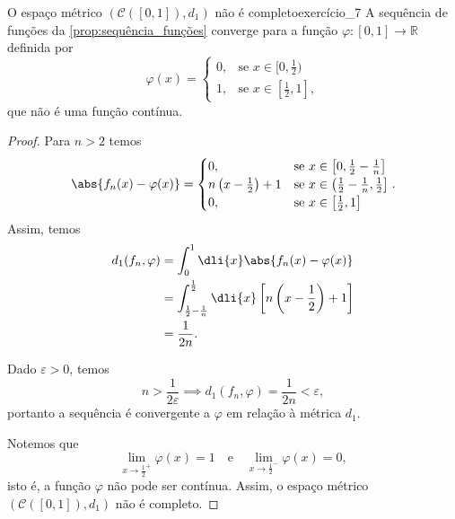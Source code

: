 \begin{proposition}{O espaço métrico \((\mathcal{C}([0,1]), d_1)\) não é completo}{exercício_7}
    A sequência de funções da \cref{prop:sequência_funções} converge para a função \(\varphi : [0,1] \to \mathbb{R}\) definida por
    \begin{equation*}
        \varphi(x) = \begin{cases}
            0, &\text{se }x \in [0,\frac12)\\
            1, &\text{se }x \in [\frac12,1],
        \end{cases}
    \end{equation*}
    que não é uma função contínua.
\end{proposition}
\begin{proof}
    Para \(n > 2\) temos
    \begin{equation*}
        \abs{f_n(x) - \varphi(x)} = \begin{cases}
            0, &\text{se }x \in \left[0, \frac12-\frac1n\right]\\
            n\left(x - \frac12\right) + 1&\text{se }x \in \left(\frac12 - \frac1n, \frac12\right]\\
            0, &\text{se }x \in \left[\frac12, 1\right]\\
        \end{cases}.
    \end{equation*}
    Assim, temos
    \begin{align*}
        d_1(f_n, \varphi) &= \int_0^1\dli{x} \abs{f_n(x) - \varphi(x)} \\
                          &= \int_{\frac12-\frac1n}^{\frac12}\dli{x} \left[n\left(x - \frac12\right) + 1\right]\\
                          &= \frac1{2n}.
    \end{align*}

    Dado \(\varepsilon > 0\), temos
    \begin{equation*}
        n > \frac{1}{2\varepsilon} \implies d_1(f_n, \varphi) = \frac{1}{2n} < \varepsilon,
    \end{equation*}
    portanto a sequência é convergente a \(\varphi\) em relação à métrica \(d_1\).

    Notemos que
    \begin{equation*}
        \lim_{x \to \frac12^+} \varphi(x) = 1\quad\text{e}\quad\lim_{x\to\frac12^-}\varphi(x) = 0,
    \end{equation*}
    isto é, a função \(\varphi\) não pode ser contínua. Assim, o espaço métrico \((\mathcal{C}([0,1]),d_1)\) não é completo.
\end{proof}
